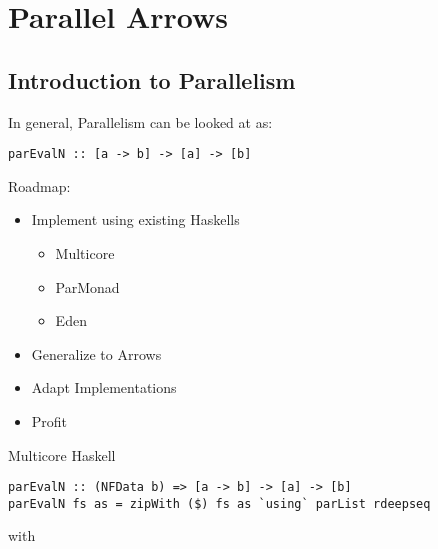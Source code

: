 \section{Parallel Arrows}
\subsection{Introduction to Parallelism}
\begin{frame}[fragile]
In general, Parallelism can be looked at as:
\begin{lstlisting}[frame=htrbl]
parEvalN :: [a -> b] -> [a] -> [b]
\end{lstlisting}

Roadmap:
\begin{itemize}
\item Implement using existing Haskells
\begin{itemize}
\item Multicore
\item ParMonad
\item Eden
\end{itemize}
\item Generalize to Arrows
\item Adapt Implementations
\item Profit
\end{itemize}
\end{frame}

\begin{frame}[fragile]{Multicore Haskell}
\begin{lstlisting}[frame=htrbl]
parEvalN :: (NFData b) => [a -> b] -> [a] -> [b]
parEvalN fs as = zipWith ($) fs as `using` parList rdeepseq
\end{lstlisting}
with
\\~\\
\\
\\
\\
\end{frame}

